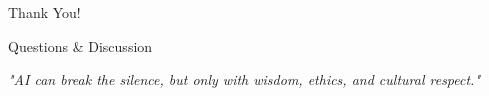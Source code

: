\documentclass[aspectratio=169]{beamer}
\begin{document}
\begin{frame}
    \begin{center}
        \Huge Thank You!
        
        \vspace{2em}
        
        \Large Questions \& Discussion
        
        \vspace{1em}
        
        \normalsize
        \textit{"AI can break the silence, but only with wisdom, ethics, and cultural respect."}
    \end{center}
\end{frame}
\end{document}
